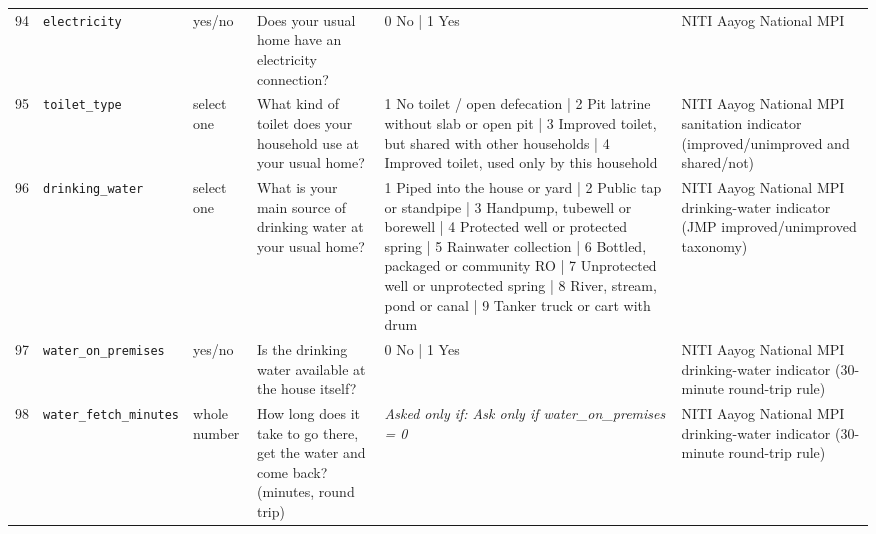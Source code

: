 \documentclass[9pt,a4paper,landscape]{article}
\begin{document}
\begin{longtable}{@{}p{0.5cm}p{3.3cm}p{1.7cm}p{7.3cm}p{5.6cm}p{5.4cm}@{}}
\footnotesize 94 & \footnotesize\texttt{electricity} & \scriptsize yes/no & \footnotesize Does your usual home have an electricity connection?\par\vspace{1pt}{\footnotesize\color{hdr}{\hifont क्या आपके असली घर में बिजली का कनेक्शन है?}} & \scriptsize 0 No | 1 Yes & \scriptsize NITI Aayog National MPI\\
\footnotesize 95 & \footnotesize\texttt{toilet\_type} & \scriptsize select one & \footnotesize What kind of toilet does your household use at your usual home?\par\vspace{1pt}{\footnotesize\color{hdr}{\hifont आपका घर अपने असली घर में किस तरह का शौचालय इस्तेमाल करता है?}} & \scriptsize 1 No toilet / open defecation | 2 Pit latrine without slab or open pit | 3 Improved toilet, but shared with other households | 4 Improved toilet, used only by this household & \scriptsize NITI Aayog National MPI sanitation indicator (improved/unimproved and shared/not)\\
\footnotesize 96 & \footnotesize\texttt{drinking\_water} & \scriptsize select one & \footnotesize What is your main source of drinking water at your usual home?\par\vspace{1pt}{\footnotesize\color{hdr}{\hifont आपके असली घर में पीने का पानी मुख्य रूप से कहाँ से आता है?}} & \scriptsize 1 Piped into the house or yard | 2 Public tap or standpipe | 3 Handpump, tubewell or borewell | 4 Protected well or protected spring | 5 Rainwater collection | 6 Bottled, packaged or community RO | 7 Unprotected well or unprotected spring | 8 River, stream, pond or canal | 9 Tanker truck or cart with drum & \scriptsize NITI Aayog National MPI drinking-water indicator (JMP improved/unimproved taxonomy)\\
\footnotesize 97 & \footnotesize\texttt{water\_on\_premises} & \scriptsize yes/no & \footnotesize Is the drinking water available at the house itself?\par\vspace{1pt}{\footnotesize\color{hdr}{\hifont क्या पीने का पानी घर पर ही मिल जाता है?}} & \scriptsize 0 No | 1 Yes & \scriptsize NITI Aayog National MPI drinking-water indicator (30-minute round-trip rule)\\
\footnotesize 98 & \footnotesize\texttt{water\_fetch\_minutes} & \scriptsize whole number & \footnotesize How long does it take to go there, get the water and come back? (minutes, round trip)\par\vspace{1pt}{\footnotesize\color{hdr}{\hifont वहाँ जाने, पानी भरने और लौटने में कुल कितना समय लगता है? (मिनट)}} & \scriptsize \textit{Asked only if: Ask only if water\_on\_premises = 0} & \scriptsize NITI Aayog National MPI drinking-water indicator (30-minute round-trip rule)\\

\end{longtable}
\end{document}
